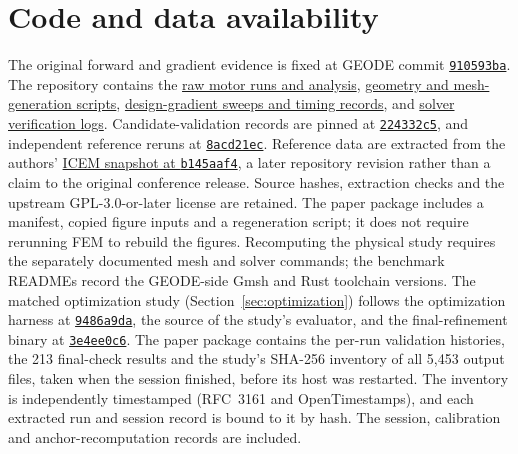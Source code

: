 \documentclass{anvil-paper}
\begin{document}
\section*{Code and data availability}
The original forward and gradient evidence is fixed at GEODE commit
\href{https://github.com/rjwalters/geode-fem/tree/910593bad6f64f9f01671c2632b57034e72b9c61}{\texttt{910593ba}}.
The repository contains the
\href{https://github.com/rjwalters/geode-fem/tree/910593bad6f64f9f01671c2632b57034e72b9c61/benchmarks/motor_reference/forward_harmonic}{raw motor runs and analysis},
\href{https://github.com/rjwalters/geode-fem/tree/910593bad6f64f9f01671c2632b57034e72b9c61/benchmarks/motor_reference/geometry}{geometry and mesh-generation scripts},
\href{https://github.com/rjwalters/geode-fem/tree/910593bad6f64f9f01671c2632b57034e72b9c61/benchmarks/motor_shape_gradient/design}{design-gradient sweeps and timing records},
and \href{https://github.com/rjwalters/geode-fem/tree/910593bad6f64f9f01671c2632b57034e72b9c61/benchmarks/motor_nonlinear_m1}{solver verification logs}.
Candidate-validation records are pinned at
\href{https://github.com/rjwalters/geode-fem/tree/224332c526be1191183af82b610973c7778de720/benchmarks/motor_validation}{\texttt{224332c5}},
and independent reference reruns at
\href{https://github.com/rjwalters/geode-fem/tree/8acd21ecf85d89fe077275a3c04ca70b53963d43/benchmarks/motor_reference/reference_refinement}{\texttt{8acd21ec}}.
Reference data are extracted from the authors'
\href{https://github.com/MichaelWiesheu/ICEMsnapshot/tree/b145aaf4ab1a6424828bc941eaf172f48fa0d458}{ICEM snapshot at \texttt{b145aaf4}},
a later repository revision rather than a claim to the original conference
release. Source hashes, extraction checks and the upstream GPL-3.0-or-later license
are retained. The paper package includes a manifest, copied figure inputs
and a regeneration script; it does not require rerunning FEM to rebuild
the figures. Recomputing the physical study requires the separately
documented mesh and solver commands; the benchmark READMEs record the
GEODE-side Gmsh and Rust toolchain versions.
The matched optimization study (Section~\ref{sec:optimization}) follows the
optimization harness at
\href{https://github.com/rjwalters/geode-fem/tree/9486a9da58beeca91968d4d3608f06b998abff45/benchmarks/motor_optimization}{\texttt{9486a9da}},
the source of the study's evaluator, and the final-refinement binary at
\href{https://github.com/rjwalters/geode-fem/tree/3e4ee0c63a86dbf014a76c9faf04dd962da16911/crates/geode-core/examples/icem_final_refinement.rs}{\texttt{3e4ee0c6}}.
The paper package contains the per-run validation histories, the 213
final-check results and the study's SHA-256 inventory of all 5,453 output
files, taken when the session finished, before its host was restarted.
The inventory is independently timestamped (RFC~3161 and OpenTimestamps),
and each extracted run and session record is bound to it by hash. The
session, calibration and anchor-recomputation records are included.
\end{document}

